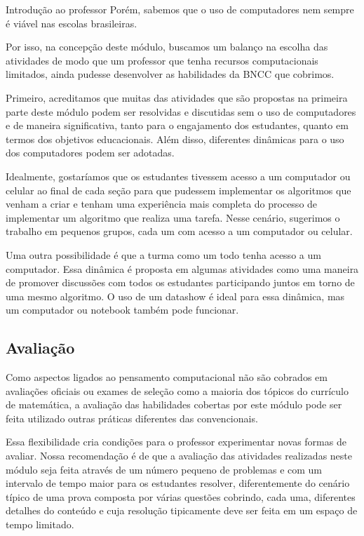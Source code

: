\begin{apresentacao}{Introdução ao professor}
Porém, sabemos que o uso de computadores nem sempre é viável nas escolas brasileiras.

Por isso, na concepção deste módulo, buscamos um balanço na escolha das atividades de modo que um professor que tenha recursos computacionais limitados, ainda pudesse desenvolver as habilidades da BNCC que cobrimos.

Primeiro, acreditamos que muitas das atividades que são propostas na primeira parte deste módulo podem ser resolvidas e discutidas sem o uso de computadores e de maneira significativa, tanto para o engajamento dos estudantes, quanto em termos dos objetivos educacionais. Além disso, diferentes dinâmicas para o uso dos computadores podem ser adotadas.

Idealmente, gostaríamos que os estudantes tivessem acesso a um computador ou celular ao final de cada seção para que pudessem implementar os algoritmos que venham a criar e tenham uma experiência mais completa do processo de implementar um algoritmo que realiza uma tarefa. Nesse cenário, sugerimos o trabalho em pequenos grupos, cada um com acesso a um computador ou celular.

Uma outra possibilidade é que a turma como um todo tenha acesso a um computador. Essa dinâmica é proposta em algumas atividades como uma maneira de promover discussões com todos os estudantes participando juntos em torno de uma mesmo algoritmo. O uso de um datashow é ideal para essa dinâmica, mas um computador ou notebook também pode funcionar.

\subsection{Avaliação}

Como aspectos ligados ao pensamento computacional não são cobrados em avaliações oficiais ou exames de seleção como a maioria dos tópicos do currículo de matemática, a avaliação das habilidades cobertas por este módulo pode ser feita utilizado outras práticas diferentes das convencionais.

Essa flexibilidade cria condições para o professor experimentar novas formas de avaliar. Nossa recomendação é de que a avaliação das atividades realizadas neste módulo seja feita através de um número pequeno de problemas e com um intervalo de tempo maior para os estudantes resolver, diferentemente do cenário típico de uma prova composta por várias questões cobrindo, cada uma, diferentes detalhes do conteúdo e cuja resolução tipicamente deve ser feita em um espaço de tempo limitado.


\end{apresentacao}
